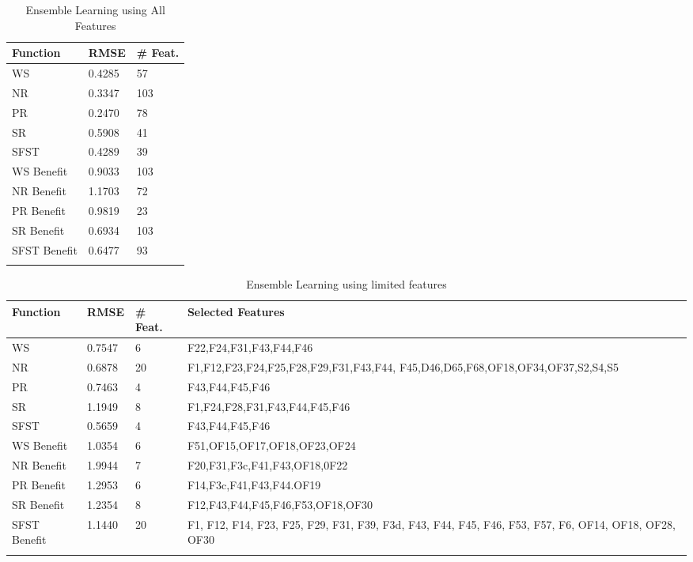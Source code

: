 \begin{longtable}{|p{3cm}|p{2cm}|p{2cm}|}
\hline
\textbf{Function} & \textbf{RMSE} & \textbf{\# Feat.} \\ \hline

WS & 0.4285 & 57  \\ \hline
NR & 0.3347 & 103  \\ \hline
PR &  0.2470 & 78 \\ \hline
SR &  0.5908 & 41  \\ \hline
SFST &  0.4289 & 39  \\ \hline
WS Benefit & 0.9033 & 103  \\ \hline
NR Benefit &  1.1703 & 72 \\ \hline
PR Benefit &  0.9819 & 23  \\ \hline
SR Benefit &  0.6934 & 103  \\ \hline
SFST Benefit & 0.6477  & 93   \\ \hline
\caption{Ensemble Learning using All Features}
\label{fig_mse_spec:lowest_best_rmse_featred}
\end{longtable}

\begin{longtable}{|p{3cm}|p{2cm}|p{2cm}|p{8cm}|}
\hline
\textbf{Function} & \textbf{RMSE} & \textbf{\# Feat.} & \textbf{Selected Features} \\ \hline

WS & 0.7547 & 6 & F22,F24,F31,F43,F44,F46 \\ \hline
NR & 0.6878 & 20 & F1,F12,F23,F24,F25,F28,F29,F31,F43,F44, F45,D46,D65,F68,OF18,OF34,OF37,S2,S4,S5 \\ \hline
PR &  0.7463 & 4 &F43,F44,F45,F46 \\ \hline
SR &  1.1949 & 8 & F1,F24,F28,F31,F43,F44,F45,F46\\ \hline
SFST &  0.5659 & 4 & F43,F44,F45,F46\\ \hline
WS Benefit & 1.0354 & 6 & F51,OF15,OF17,OF18,OF23,OF24 \\ \hline
NR Benefit &  1.9944 & 7 &  F20,F31,F3c,F41,F43,OF18,0F22 \\ \hline
PR Benefit &  1.2953 & 6 &  F14,F3c,F41,F43,F44.OF19\\ \hline
SR Benefit &  1.2354 & 8 &  F12,F43,F44,F45,F46,F53,OF18,OF30 \\ \hline
SFST Benefit & 1.1440  & 20 & F1, F12, F14, F23, F25, F29, F31,  F39, F3d, F43, F44, F45, F46,  F53, F57, F6, OF14, OF18, OF28, OF30 \\ \hline
\caption{Ensemble Learning using limited features}
\label{fig_mse_spec:lowest_smallest_rmse_featred}
\end{longtable}